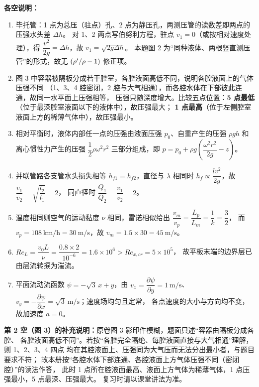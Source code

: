 \begin{tishi}
\textbf{各空说明：}
\begin{enumerate}[label=\arabic*.,leftmargin=2.2em]
  \item 毕托管：1 点为总压（驻点）孔、2 点为静压孔，两测压管的读数差即两点的压强水头差 $\Delta h$。
        对 1、2 两点写伯努利方程，驻点 $v_1=0$（或按相对速度处理），得
        $\dfrac{v^{2}}{2g}=\Delta h$，故 $v_1=\sqrt{2g\Delta h}$。
        本题图 2 为“同种液体、两根竖直测压管”的形式，故无 $\left(\rho'\middle/\rho-1\right)$ 修正项。
  \item 图 3 中容器被隔板分成若干腔室，各腔液面高低不同，说明各腔液面上的气体压强不同
        （1、3、4 腔密闭，2 腔与大气相通），而各腔水体在下部彼此连通，故同一水平面上压强相等，
        压强只随深度增大。比较五点位置：\textbf{5 点最低}（位于最深腔室液面以下的液体中），故压强最大；
        \textbf{1 点最高}（位于左侧腔室液面上方的稀薄气体中），故压强最小。
  \item 相对平衡时，液体内部任一点的压强由液面压强 $p_0$、自重产生的压强 $\rho g h$
        和离心惯性力产生的压强 $\dfrac{1}{2}\rho\omega^{2}r^{2}$ 三部分组成，即
        $p=p_0+\rho g\!\left(\dfrac{\omega^{2}r^{2}}{2g}-z\right)$。
  \item 并联管路各支管水头损失相等 $h_{f1}=h_{f2}$，直径与 $\lambda$ 相同时
        $h_f\propto \dfrac{l v^{2}}{2g}$，故 $\dfrac{v_1}{v_2}=\sqrt{\dfrac{l_2}{l_1}}=2$，
        同直径时 $\dfrac{Q_1}{Q_2}=\dfrac{v_1}{v_2}=2$。
  \item 温度相同则空气的运动黏度 $\nu$ 相同，雷诺相似给出
        $\dfrac{v_m}{v_p}=\dfrac{L_p}{L_m}=\dfrac{1}{k}=\dfrac{3}{2}$，
        而 $v_p=108\ \mathrm{km/h}=30\ \mathrm{m/s}$，故 $v_m=1.5\times30=45\ \mathrm{m/s}$。
  \item $Re_L=\dfrac{v_0L}{\nu}=\dfrac{0.8\times2}{10^{-6}}=1.6\times10^{6}>Re_{x,cr}=5\times10^{5}$，
        故平板末端的边界层已由层流转捩为湍流。
  \item 平面流动流函数 $\psi=-\sqrt{3}\,x+y$，由 $v_x=\dfrac{\partial\psi}{\partial y}=1\ \mathrm{m/s}$、
        $v_y=-\dfrac{\partial\psi}{\partial x}=\sqrt{3}\ \mathrm{m/s}$；速度场均匀且定常，
        各点速度的大小与方向均不变，故加速度 $a=0$。
\end{enumerate}
\end{tishi}

\begin{tishi}
\textbf{第 2 空（图 3）的补充说明：}原卷图 3 影印件模糊，题面只述“容器由隔板分成各腔、
各腔液面高低不同”。若按“各腔完全隔绝、每腔液面直接与大气相通”理解，则 1、2、3、4 四点
均在其腔液面上、压强同为大气压而无法分出最小者，与题目要求不符；
故本册按“各腔水体下部连通、各腔液面上方气体压强不同（密闭腔）”的读法作答，
此时 1 点所在腔液面最高、液面上方气体为稀薄气体，1 点压强最小，5 点最深、压强最大。
复习时请以课堂讲法为准。
\end{tishi}

